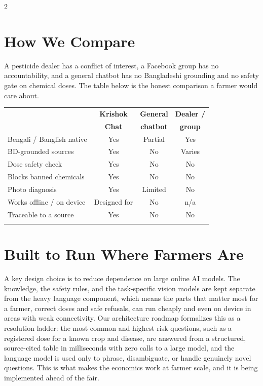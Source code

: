 \documentclass[11pt]{article}
\begin{document}
\begin{multicols}{2}
\section{How We Compare}

A pesticide dealer has a conflict of interest, a Facebook group has no accountability, and a general chatbot has no Bangladeshi grounding and no safety gate on chemical doses. The table below is the honest comparison a farmer would care about.

\begin{center}
\small
\begin{tabular}{@{}>{\raggedright\arraybackslash}p{2.5cm} c c c@{}}
\arrayrulecolor{brandgreen}\toprule
 & \textbf{Krishok} & \textbf{General} & \textbf{Dealer /} \\
 & \textbf{Chat} & \textbf{chatbot} & \textbf{group} \\
\midrule
Bengali / Banglish native & Yes & Partial & Yes \\
BD-grounded sources & Yes & No & Varies \\
Dose safety check & Yes & No & No \\
Blocks banned chemicals & Yes & No & No \\
Photo diagnosis & Yes & Limited & No \\
Works offline / on device & Designed for & No & n/a \\
Traceable to a source & Yes & No & No \\
\arrayrulecolor{brandgreen}\bottomrule
\end{tabular}
\end{center}

\section{Built to Run Where Farmers Are}

A key design choice is to reduce dependence on large online AI models. The knowledge, the safety rules, and the task-specific vision models are kept separate from the heavy language component, which means the parts that matter most for a farmer, correct doses and safe refusals, can run cheaply and even on device in areas with weak connectivity. Our architecture roadmap formalizes this as a resolution ladder: the most common and highest-risk questions, such as a registered dose for a known crop and disease, are answered from a structured, source-cited table in milliseconds with zero calls to a large model, and the language model is used only to phrase, disambiguate, or handle genuinely novel questions. This is what makes the economics work at farmer scale, and it is being implemented ahead of the fair.


\end{multicols}
\end{document}
